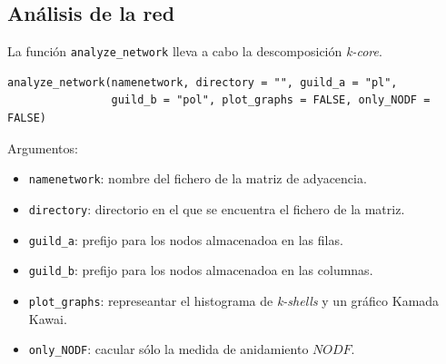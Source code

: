 \subsection*{Análisis de la red}
\label{network_analysis}

La función \texttt{analyze\_network} lleva a cabo la descomposición \textit{k-core}.

\fontsize{3.5mm}{3.5mm}\selectfont
\begin{verbatim}
analyze_network(namenetwork, directory = "", guild_a = "pl",
                guild_b = "pol", plot_graphs = FALSE, only_NODF = FALSE)
\end{verbatim}
\normalsize

Argumentos:
\small
\begin{itemize}

\item \texttt{namenetwork}: nombre del fichero de la matriz de adyacencia.
	
\item \texttt{directory}: directorio en el que se encuentra el fichero de la matriz.

\item \texttt{guild\_a}: prefijo para los nodos almacenadoa en las filas.

\item \texttt{guild\_b}: prefijo para los nodos almacenadoa en las columnas.

\item \texttt{plot\_graphs}: represeantar el histograma de \textit{k-shells} y un gráfico Kamada Kawai.

\item \texttt{only\_NODF}: cacular sólo la medida de anidamiento $NODF$.

\end{itemize}

